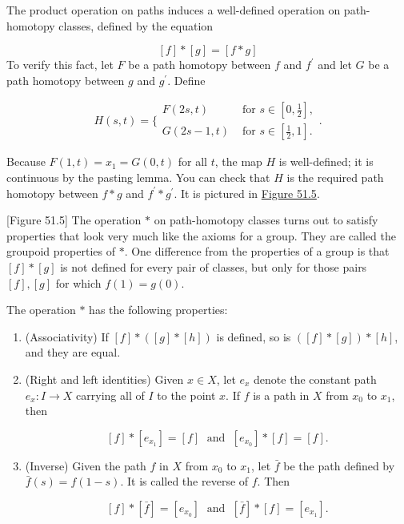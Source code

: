 The product operation on paths induces a well-defined operation on path-homotopy classes, defined by the equation

\[
[ f] * [ g] = [ {f * g}]
\]
To verify this fact, let \(F\) be a path homotopy between \(f\) and \(f^{\prime }\) and let \(G\) be a path homotopy between \(g\) and \(g^{\prime }\). Define

\[
H( {s,t}) = \{ \begin{array}{ll} F( {{2s},t}) & \text{ for }s \in [ {0,\frac{1}{2}}] , \\ G( {{2s} - 1,t}) & \text{ for }s \in [ {\frac{1}{2},1}] . \end{array}.
\]

Because \(F( {1,t}) = x_{1} = G( {0,t})\) for all \(t\), the map \(H\) is well-defined; it is continuous by the pasting lemma. You can check that \(H\) is the required path homotopy between \(f * g\) and \(f^{\prime } * g^{\prime }\). It is pictured in \hyperref[fig:51.5]{Figure 51.5}.

[Figure 51.5]
The operation \(*\) on path-homotopy classes turns out to satisfy properties that look very much like the axioms for a group. They are called the groupoid properties of \(*\). One difference from the properties of a group is that \([ f] * [ g]\) is not defined for every pair of classes, but only for those pairs \([ f] ,[ g]\) for which \(f(1) = g( 0)\).

\begin{theorem}
\label{thm:\thetheorem}
The operation \(*\) has the following properties:

\begin{enumerate}[itemsep=0.2em, parsep=0pt, topsep=0pt, partopsep=0pt, leftmargin=*, label=(\arabic*), align=left]
\item (Associativity) If \([ f] * ( {[ g] * [ h] })\) is defined, so is \(( {[ f] * [ g] }) * [ h]\), and they are equal.

\item (Right and left identities) Given \(x \in X\), let \( e_{x}\) denote the constant path \(e_{x} : I \rightarrow X\) carrying all of \(I\) to the point \(x\). If \(f\) is a path in \(X\) from \(x_{0}\) to \(x_{1}\), then

\[
[ f] * [ e_{x_{1}}] = [ f] \;\text{ and }\;[ e_{x_{0}}] * [ f] = [ f] .
\]

\item (Inverse) Given the path \(f\) in \(X\) from \(x_{0}\) to \(x_{1}\), let \(\bar{f}\) be the path defined by \(\bar{f}( s) = f( {1 - s})\). It is called the reverse of \(f\). Then

\[
[ f] * [ \bar{f}] = [ e_{x_{0}}] \;\text{ and }\;[ \bar{f}] * [ f] = [ e_{x_{1}}] .
\]
\end{enumerate}
\end{theorem}

